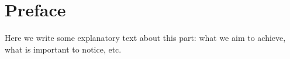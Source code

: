 \chapter{Preface}
Here we write some explanatory text about this part: what we aim to achieve, what is important to notice, etc.

